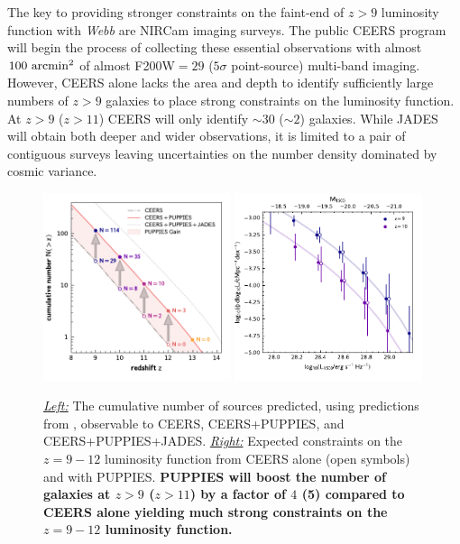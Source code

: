 \documentclass[12pt]{article}
\begin{document}
The key to providing stronger constraints on the faint-end of $z > 9$ luminosity function with \emph{Webb} are NIRCam imaging surveys. The public CEERS program will begin the process of collecting these essential observations with almost $100\ {\rm arcmin^2}$ of almost F200W$=29$ ($5\sigma$ point-source) multi-band imaging. However, CEERS alone lacks the area and depth to identify sufficiently large numbers of $z>9$ galaxies to place strong constraints on the luminosity function. At $z>9$ ($z>11$) CEERS will only identify $\sim 30$ ($\sim 2$) galaxies. While JADES will obtain both deeper and wider observations, it is limited to a pair of contiguous surveys leaving uncertainties on the number density dominated by cosmic variance. 

 \begin{figure}[h!]
    \centering
    \includegraphics[width=0.49\textwidth]{figs/CN_surveys.pdf}
    \includegraphics[width=0.49\textwidth]{figs/LF_evo.pdf}
    \vspace{-5mm}
    \caption{\emph{\underline{Left:}} The cumulative number of sources predicted, using predictions from \citet{2019MNRAS.483.2983Y}, observable to CEERS, CEERS+PUPPIES, and CEERS+PUPPIES+JADES.  \emph{\underline{Right:}} Expected constraints on the $z=9-12$ luminosity function from CEERS alone (open symbols) and with PUPPIES. \textbf{PUPPIES will boost the number of galaxies at $z>9$ ($z>11$) by a factor of $4$ (5) compared to CEERS alone yielding much strong constraints on the $z=9-12$ luminosity function.}}
    \label{fig:vs_CEERS}
\end{figure}
\end{document}
